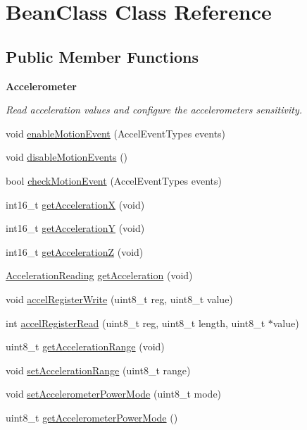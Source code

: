 \hypertarget{class_bean_class}{}\section{Bean\+Class Class Reference}
\label{class_bean_class}
\subsection*{Public Member Functions}
\begin{Indent}{\bf Accelerometer}\par
{\em Read acceleration values and configure the accelerometer\textquotesingle{}s sensitivity. }\begin{DoxyCompactItemize}
\item 
void \hyperlink{class_bean_class_a9d2f98bbb1b8a715c0fe549c438f44ed}{enable\+Motion\+Event} (Accel\+Event\+Types events)
\item 
void \hyperlink{class_bean_class_a0f9fb65a465070f9f3e9cdf4f2687bdc}{disable\+Motion\+Events} ()
\item 
bool \hyperlink{class_bean_class_a75492018fa92ad32c06a12ce456dc74c}{check\+Motion\+Event} (Accel\+Event\+Types events)
\item 
int16\+\_\+t \hyperlink{class_bean_class_a00cf73de73eeb00d220efa32a830d6ef}{get\+Acceleration\+X} (void)
\item 
int16\+\_\+t \hyperlink{class_bean_class_aba0554ca18558748b67205bd5bdcaeac}{get\+Acceleration\+Y} (void)
\item 
int16\+\_\+t \hyperlink{class_bean_class_a5c977e7b185ebc038335228d8ef1d0b9}{get\+Acceleration\+Z} (void)
\item 
\hyperlink{struct_a_c_c___r_e_a_d_i_n_g___t}{Acceleration\+Reading} \hyperlink{class_bean_class_a53f2174dd2f3c2907acc3355cef64842}{get\+Acceleration} (void)
\item 
void \hyperlink{class_bean_class_a47244506c985ef7aead3695811002ad2}{accel\+Register\+Write} (uint8\+\_\+t reg, uint8\+\_\+t value)
\item 
int \hyperlink{class_bean_class_a3e743eb8cc8e5e04364f53801b8fe83e}{accel\+Register\+Read} (uint8\+\_\+t reg, uint8\+\_\+t length, uint8\+\_\+t $\ast$value)
\item 
uint8\+\_\+t \hyperlink{class_bean_class_ad08dec6f240de8a53f110ddf066f6ab2}{get\+Acceleration\+Range} (void)
\item 
void \hyperlink{class_bean_class_acb8e9a741e2538393256f95d27c4571d}{set\+Acceleration\+Range} (uint8\+\_\+t range)
\item 
void \hyperlink{class_bean_class_a4eebb09ead4b598ef56c359ed14141be}{set\+Accelerometer\+Power\+Mode} (uint8\+\_\+t mode)
\item 
uint8\+\_\+t \hyperlink{class_bean_class_afb4f9a75f687547ff8f6cb4146ab30fa}{get\+Accelerometer\+Power\+Mode} ()
\end{DoxyCompactItemize}
\end{Indent}
